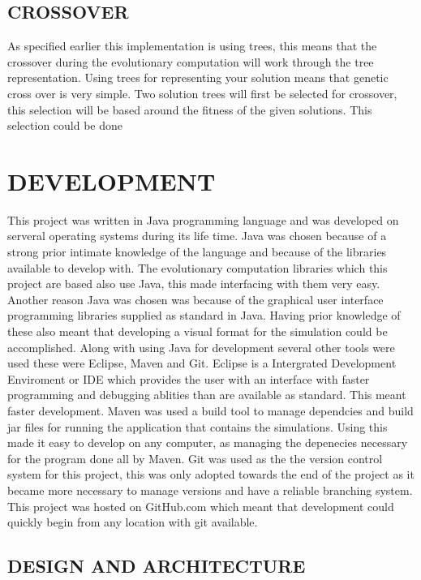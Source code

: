 \documentclass[10pt,twocolumn]{article}
\begin{document}
\subsection{CROSSOVER}

As specified earlier this implementation is using trees, this means that the crossover during the evolutionary computation
will work through the tree representation. Using trees for representing your solution means that genetic cross over is
very simple. Two solution trees will first be selected for crossover, this selection will be based around the fitness of the given
solutions. This selection could be done 

\section{DEVELOPMENT}

This project was written in Java programming language and was developed on serveral operating systems during its life time. 
Java was chosen because of a strong prior intimate knowledge of the language and because of the libraries available to develop with. 
The evolutionary computation libraries which this project are based also use Java, this made interfacing with them very easy. 
Another reason Java was chosen was because of the graphical user interface programming libraries supplied as standard in Java. 
Having prior knowledge of these also meant that developing a visual format for the simulation could be accomplished.  Along with using 
Java for development several other tools were used these were Eclipse, Maven and Git. Eclipse is a Intergrated Development Enviroment or 
IDE which provides the user with an interface with faster programming and debugging ablities than are available as standard.
This meant faster development. Maven was used a build tool to manage dependcies and build jar files for running the application 
that contains the simulations. Using this made it easy to develop on any computer, as managing the depenecies necessary for the 
program done all by Maven. Git was used as the the version control system for this project, this was only adopted towards the 
end of the project as it became more necessary to manage versions and have a reliable branching system. This project was hosted 
on GitHub.com which meant that development could quickly begin from any location with git available. 

\subsection{DESIGN AND ARCHITECTURE}
\end{document}
